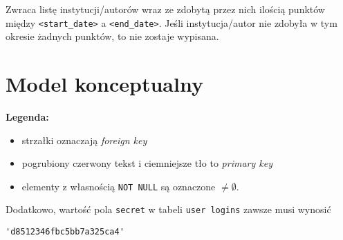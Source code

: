 \documentclass[12pt]{article}
\def\inline{\lstinline[basicstyle=\ttfamily\large\color{orange!50!fg}]}
\begin{document}
Zwraca listę instytucji/autorów wraz ze zdobytą przez nich ilością punktów między \inline{<start_date>} a \inline{<end_date>}. Jeśli instytucja/autor nie zdobyła w tym okresie żadnych punktów, to nie zostaje wypisana.

\newpage

\section{Model konceptualny}

\textbf{Legenda:}
\begin{itemize}
  \item strzałki oznaczają \emph{foreign key}
  \item pogrubiony czerwony tekst i ciemniejsze tło to \emph{primary key}
  \item elementy z własnością \inline{NOT NULL} są oznaczone $\neq\emptyset$.
\end{itemize}
Dodatkowo, wartość pola \inline{secret} w tabeli \inline{user logins} zawsze musi wynosić 

\inline{'d8512346fbc5bb7a325ca4'}
\end{document}
